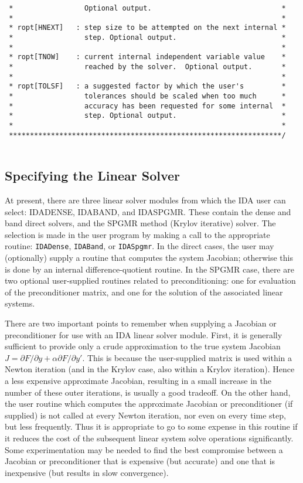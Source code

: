 \begin{verbatim}
 *                 Optional output.                               *
 *                                                                *
 * ropt[HNEXT]   : step size to be attempted on the next internal *
 *                 step. Optional output.                         *
 *                                                                *
 * ropt[TNOW]    : current internal independent variable value    *
 *                 reached by the solver.  Optional output.       *
 *                                                                *
 * ropt[TOLSF]   : a suggested factor by which the user's         *
 *                 tolerances should be scaled when too much      *
 *                 accuracy has been requested for some internal  *
 *                 step. Optional output.                         *
 *                                                                *
 *****************************************************************/
 
\end{verbatim}
\normalsize


\subsection{Specifying the Linear Solver}

At present, there are three linear solver modules from which the IDA
user can select: IDADENSE, IDABAND, and IDASPGMR.  These contain the
dense and band direct solvers, and the SPGMR method (Krylov iterative)
solver.  The selection is made in the user program by making a call to
the appropriate routine: {\tt IDADense}, {\tt IDABand}, or
{\tt IDASpgmr}.  In the direct cases, the user may (optionally) supply
a routine that computes the system Jacobian; otherwise this is done by
an internal difference-quotient routine.  In the SPGMR case, there
are two optional user-supplied routines related to preconditioning:
one for evaluation of the preconditioner matrix, and one for the
solution of the associated linear systems.

There are two important points to remember when supplying a Jacobian or
preconditioner for use with an IDA linear solver module.  First, it is
generally sufficient to provide only a crude approximation to the true
system Jacobian
$J = \partial F / \partial y + \alpha \partial F / \partial y'$.  This
is because the user-supplied matrix is used within a Newton iteration
(and in the Krylov case, also within a Krylov iteration).  Hence a
less expensive approximate Jacobian, resulting in a small increase in
the number of these outer iterations, is usually a good tradeoff.
On the other hand, the user routine which computes the approximate
Jacobian or preconditioner (if supplied) is not called at every Newton
iteration, nor even on every time step, but less frequently.
Thus it is appropriate to go to some expense in this routine if it
reduces the cost of the subsequent linear system solve operations
significantly.  Some experimentation may be needed to find the best
compromise between a Jacobian or preconditioner that is expensive (but
accurate) and one that is inexpensive (but results in slow convergence).

